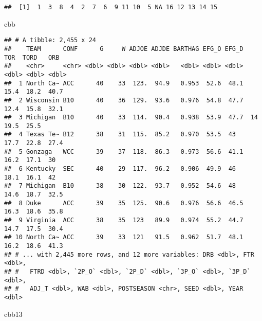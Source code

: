 \documentclass[
]{article}
\newenvironment{Shaded}{\begin{snugshade}}{\end{snugshade}}
\newcommand{\FunctionTok}[1]{\textcolor[rgb]{0.00,0.00,0.00}{#1}}
\newcommand{\NormalTok}[1]{#1}
\newcommand{\SpecialCharTok}[1]{\textcolor[rgb]{0.00,0.00,0.00}{#1}}
\begin{document}
\begin{Shaded}
\end{Shaded}

\begin{verbatim}
##  [1]  1  3  8  4  2  7  6  9 11 10  5 NA 16 12 13 14 15
\end{verbatim}

\begin{Shaded}
\begin{Highlighting}[]
\NormalTok{cbb}
\end{Highlighting}
\end{Shaded}

\begin{verbatim}
## # A tibble: 2,455 x 24
##    TEAM      CONF      G     W ADJOE ADJDE BARTHAG EFG_O EFG_D   TOR  TORD   ORB
##    <chr>     <chr> <dbl> <dbl> <dbl> <dbl>   <dbl> <dbl> <dbl> <dbl> <dbl> <dbl>
##  1 North Ca~ ACC      40    33  123.  94.9   0.953  52.6  48.1  15.4  18.2  40.7
##  2 Wisconsin B10      40    36  129.  93.6   0.976  54.8  47.7  12.4  15.8  32.1
##  3 Michigan  B10      40    33  114.  90.4   0.938  53.9  47.7  14    19.5  25.5
##  4 Texas Te~ B12      38    31  115.  85.2   0.970  53.5  43    17.7  22.8  27.4
##  5 Gonzaga   WCC      39    37  118.  86.3   0.973  56.6  41.1  16.2  17.1  30  
##  6 Kentucky  SEC      40    29  117.  96.2   0.906  49.9  46    18.1  16.1  42  
##  7 Michigan  B10      38    30  122.  93.7   0.952  54.6  48    14.6  18.7  32.5
##  8 Duke      ACC      39    35  125.  90.6   0.976  56.6  46.5  16.3  18.6  35.8
##  9 Virginia  ACC      38    35  123   89.9   0.974  55.2  44.7  14.7  17.5  30.4
## 10 North Ca~ ACC      39    33  121   91.5   0.962  51.7  48.1  16.2  18.6  41.3
## # ... with 2,445 more rows, and 12 more variables: DRB <dbl>, FTR <dbl>,
## #   FTRD <dbl>, `2P_O` <dbl>, `2P_D` <dbl>, `3P_O` <dbl>, `3P_D` <dbl>,
## #   ADJ_T <dbl>, WAB <dbl>, POSTSEASON <chr>, SEED <dbl>, YEAR <dbl>
\end{verbatim}

\begin{Shaded}
\begin{Highlighting}[]
\NormalTok{cbb13}
\end{Highlighting}
\end{Shaded}
\end{document}
